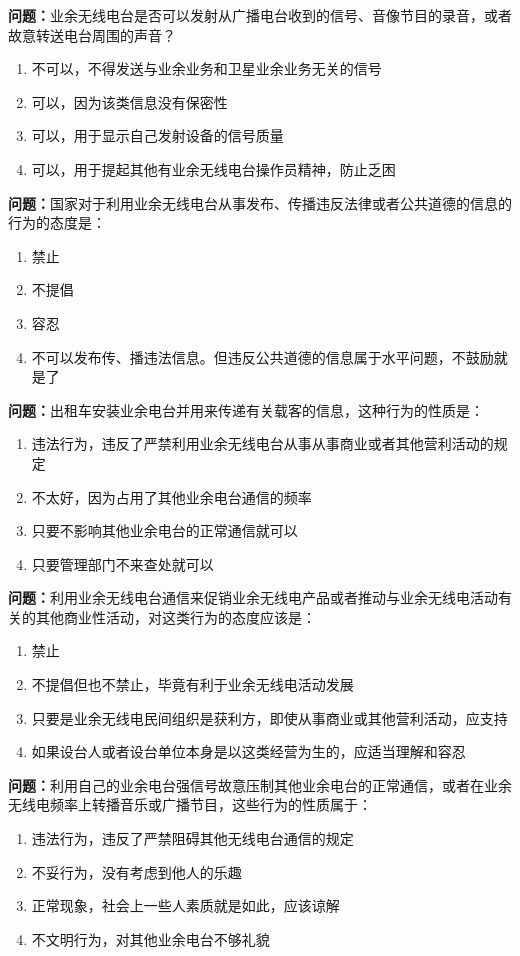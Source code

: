 \textbf{问题：}业余无线电台是否可以发射从广播电台收到的信号、音像节目的录音，或者故意转送电台周围的声音？
\begin{enumerate}[label=\Alph*), leftmargin=1cm]
	\item 不可以，不得发送与业余业务和卫星业余业务无关的信号
	\item 可以，因为该类信息没有保密性
	\item 可以，用于显示自己发射设备的信号质量
	\item 可以，用于提起其他有业余无线电台操作员精神，防止乏困
\end{enumerate}

\textbf{问题：}国家对于利用业余无线电台从事发布、传播违反法律或者公共道德的信息的行为的态度是：
\begin{enumerate}[label=\Alph*), leftmargin=1cm]
	\item 禁止
	\item 不提倡
	\item 容忍
	\item 不可以发布传、播违法信息。但违反公共道德的信息属于水平问题，不鼓励就是了
\end{enumerate}

\textbf{问题：}出租车安装业余电台并用来传递有关载客的信息，这种行为的性质是：
\begin{enumerate}[label=\Alph*), leftmargin=1cm]
	\item 违法行为，违反了严禁利用业余无线电台从事从事商业或者其他营利活动的规定
	\item 不太好，因为占用了其他业余电台通信的频率
	\item 只要不影响其他业余电台的正常通信就可以
	\item 只要管理部门不来查处就可以
\end{enumerate}

\textbf{问题：}利用业余无线电台通信来促销业余无线电产品或者推动与业余无线电活动有关的其他商业性活动，对这类行为的态度应该是：
\begin{enumerate}[label=\Alph*), leftmargin=1cm]
	\item 禁止
	\item 不提倡但也不禁止，毕竟有利于业余无线电活动发展
	\item 只要是业余无线电民间组织是获利方，即使从事商业或其他营利活动，应支持
	\item 如果设台人或者设台单位本身是以这类经营为生的，应适当理解和容忍
\end{enumerate}

\textbf{问题：}利用自己的业余电台强信号故意压制其他业余电台的正常通信，或者在业余无线电频率上转播音乐或广播节目，这些行为的性质属于：
\begin{enumerate}[label=\Alph*), leftmargin=1cm]
	\item 违法行为，违反了严禁阻碍其他无线电台通信的规定
	\item 不妥行为，没有考虑到他人的乐趣
	\item 正常现象，社会上一些人素质就是如此，应该谅解
	\item 不文明行为，对其他业余电台不够礼貌
\end{enumerate}

